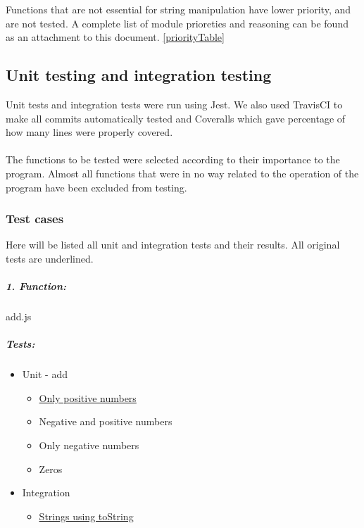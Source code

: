 \documentclass[a4paper, 12pt]{article}
\begin{document}
Functions that are not essential for string manipulation have lower priority, and are not tested.
A complete list of module prioreties and reasoning can be found as an attachment to this document. \ref{priorityTable}


    \subsection{Unit testing and integration testing}
    Unit tests and integration tests were run using Jest. We also used TravisCI to make all commits automatically tested and Coveralls which gave percentage of how many lines were properly covered. 
    \\\\
    The functions to be tested were selected according to their importance to the program. Almost all functions that were in no way related to the operation of the program have been excluded from testing. 
    \newpage

        \subsubsection{Test cases}
		Here will be listed all unit and integration tests and their results.
		All original tests are underlined.

		\hypertarget{header-n5}{%
		\subparagraph{1. Function:}\label{header-n5}}

		add.js
		
		\hypertarget{header-n7}{%
		\subparagraph{Tests:}\label{header-n7}}
		
		\begin{itemize}
		\item
		Unit - add
		
		\begin{itemize}
			\item
			\underline{Only positive numbers}
			\item
			Negative and positive numbers
			\item
			Only negative numbers
			\item
			Zeros
		\end{itemize}
		\item
		Integration
		
		\begin{itemize}
			\item
			\underline{Strings using toString}
		\end{itemize}
		\end{itemize}
		
\end{document}
